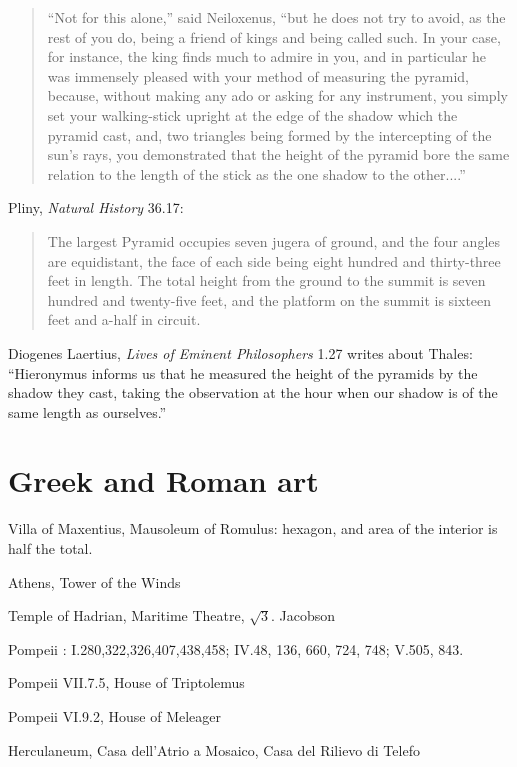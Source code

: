 \documentclass{amsart}
\theoremstyle{definition}
\begin{document}
\begin{quote}
``Not for this alone,'' said Neiloxenus, ``but he does not try to avoid, as the rest of you do, being a friend of kings and being called such.
In your case, for instance, the king finds much to admire in you, and in particular he was immensely pleased with your method of measuring the pyramid, because, without
making any ado or asking for any instrument, you simply set your walking-stick upright at the edge of the shadow which the pyramid cast, and, two triangles being formed by the 
intercepting of the sun's rays, you demonstrated that the height of the pyramid bore the same relation to the length of the stick as the one shadow to the other....''
\end{quote}

Pliny, {\em Natural History} 36.17:

\begin{quote}
The largest Pyramid occupies seven jugera of ground, and the four angles are equidistant, the face of each side being eight hundred and thirty-three feet in length. The total height from the ground to the summit is seven hundred and twenty-five feet, and the platform on the summit is sixteen feet and a-half in circuit.
\end{quote}

Diogenes Laertius, {\em Lives of Eminent Philosophers} 1.27 writes about Thales: ``Hieronymus informs us that he measured the height of the pyramids by the shadow they cast, taking the observation at the hour when our
shadow is of the same length as ourselves.''







\section{Greek and Roman art}
Villa of Maxentius, Mausoleum of Romulus: hexagon, and area of the interior is half the total.

Athens, Tower of the Winds

Temple of Hadrian,  Maritime Theatre, $\sqrt{3}$. Jacobson \cite{jacobson}

Pompeii \cite{pompei}: I.280,322,326,407,438,458; IV.48, 136, 660, 724, 748; V.505, 843.

Pompeii VII.7.5, House of Triptolemus 

Pompeii VI.9.2, House of Meleager

Herculaneum, Casa dell'Atrio a Mosaico, Casa del Rilievo di Telefo
\end{document}
